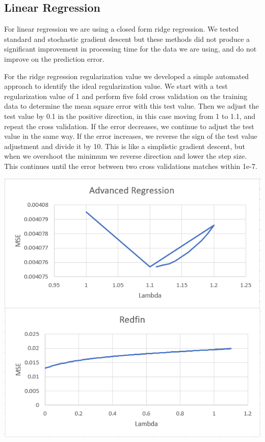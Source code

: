 \documentclass[10pt]{article}
\begin{document}
	\begin{multicols}{2}
		\subsection{Linear Regression}
			For linear regression we are using a closed form ridge regression. We tested standard and stochastic gradient descent but these methods did not produce a significant improvement in processing time for the data we are using, and do not improve on the prediction error.
		\par
			For the ridge regression regularization value we developed a simple automated approach to identify the ideal regularization value. We start with a test regularization value of 1 and perform five fold cross validation on the training data to determine the mean square error with this test value. Then we adjust the test value by 0.1 in the positive direction, in this case moving from 1 to 1.1, and repeat the cross validation. If the error decreases, we continue to adjust the test value in the same way. If the error increases, we reverse the sign of the test value adjustment and divide it by 10. This is like a simplistic gradient descent, but when we overshoot the minimum we reverse direction and lower the step size. This continues until the error between two cross validations matches within 1e-7.
		\par
		\begin{center}
                  \captionsetup{type=figure}
			\includegraphics[scale=0.60]{Images/LinearRegressionCrossTrain} \\

\end{center}
\end{multicols}
\end{document}
